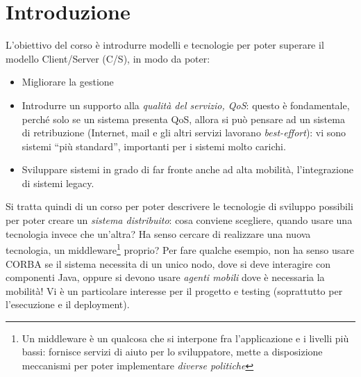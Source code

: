 \chapter{Introduzione}
L'obiettivo del corso è introdurre modelli e tecnologie per poter superare il
modello Client/Server (C/S), in modo
da poter:
\begin{itemize}
 \item Migliorare la gestione
 \item Introdurre un supporto alla \textit{qualità del servizio, QoS}: questo è fondamentale, perché solo se un sistema
 presenta QoS, allora si può pensare ad un sistema di retribuzione (Internet, mail e gli altri servizi
lavorano \textit{best-effort}): vi sono sistemi ``più standard'', importanti per i sistemi molto carichi.
\item Sviluppare sistemi in grado di far fronte anche ad alta mobilità, l'integrazione di sistemi legacy.
\end{itemize}
Si tratta quindi di un corso per poter descrivere le tecnologie di sviluppo possibili per poter creare un
\textit{sistema distribuito}: cosa conviene scegliere, quando usare una tecnologia invece che un'altra? Ha senso cercare
di realizzare una nuova tecnologia, un middleware\footnote{Un middleware è un qualcosa che si interpone fra
l'applicazione e i livelli più bassi: fornisce servizi di aiuto per lo sviluppatore, mette a disposizione meccanismi per
poter implementare \textit{diverse politiche}} proprio? Per fare qualche esempio, non ha senso usare CORBA se il sistema
necessita di un unico nodo, dove si deve interagire con componenti Java, oppure si devono usare \textit{agenti mobili}
dove è necessaria la mobilità! Vi è un particolare interesse per il progetto e testing (soprattutto per l'esecuzione e
il deployment).
